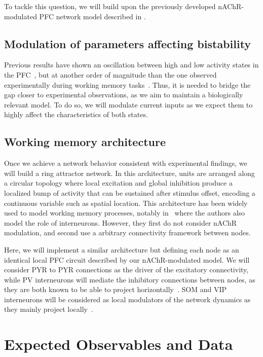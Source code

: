 \documentclass[10pt,letterpaper]{article}
\begin{document}
To tackle this question, we will build upon the previously developed nAChR-modulated PFC network model described in \citet{Koukouli2025}.

\subsection{Modulation of parameters affecting bistability}
Previous results have shown an oscillation between high and low activity states in the PFC~\citep{Rooy2021}, but at another order of magnitude than the one observed experimentally during working memory tasks~\citep{Compte2003}. Thus, it is needed to bridge the gap closer to experimental observations, as we aim to maintain a biologically relevant model. To do so, we will modulate current inputs as we expect them to highly affect the characteristics of both states.

\subsection{Working memory architecture}
Once we achieve a network behavior consistent with experimental findings, we will build a ring attractor network. In this architecture, units are arranged along a circular topology where local excitation and global inhibition produce a localized bump of activity that can be sustained after stimulus offset, encoding a continuous variable such as spatial location. This architecture has been widely used to model working memory processes, notably in~\citep{Wang2004} where the authors also model the role of interneurons. However, they first do not consider nAChR modulation, and second use a arbitrary connectivity framework between nodes. 

Here, we will implement a similar architecture but defining each node as an identical local PFC circuit described by our nAChR-modulated model. We will consider PYR to PYR connections as the driver of the excitatory connectivity, while PV interneurons will mediate the inhibitory connections between nodes, as they are both known to be able to project horizontally~\citep{Levitt1993,Druga2023}. SOM and VIP interneurons will be considered as local modulators of the network dynamics as they mainly project locally~\citep{Karnani2016,Riedemann2019}.

\section{Expected Observables and Data}
\end{document}
